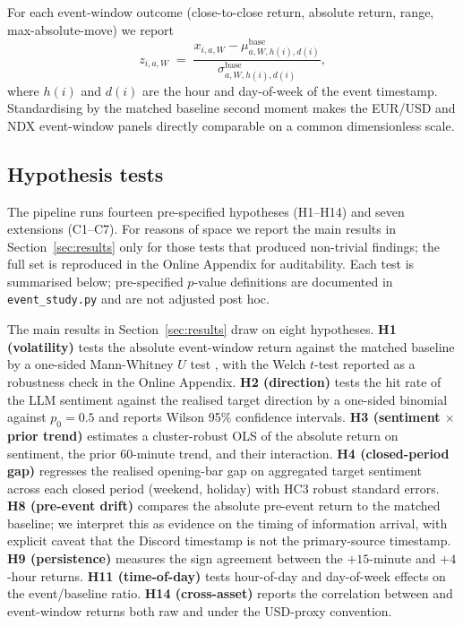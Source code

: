 For each event-window outcome (close-to-close return, absolute
return, range, max-absolute-move) we report
\begin{equation}
z_{i,a,W} \;=\; \frac{x_{i,a,W} - \mu^{\text{base}}_{a,W,h(i),d(i)}}{\sigma^{\text{base}}_{a,W,h(i),d(i)}},
\label{eq:abnormal-z}
\end{equation}
where $h(i)$ and $d(i)$ are the hour and day-of-week of the event
timestamp. Standardising by the matched baseline second moment makes
the EUR/USD and NDX event-window panels directly comparable on a
common dimensionless scale.

\subsection{Hypothesis tests}
\label{ssec:hypothesis-tests}

The pipeline runs fourteen pre-specified hypotheses (H1--H14) and
seven extensions (C1--C7). For reasons of space we report the main
results in Section~\ref{sec:results} only for those tests that
produced non-trivial findings; the full set is reproduced in the
Online Appendix for auditability. Each test is summarised below;
pre-specified $p$-value definitions are documented in
\texttt{event\_study.py} and are not adjusted post hoc.

The main results in Section~\ref{sec:results} draw on eight
hypotheses. \textbf{H1 (volatility)} tests the absolute event-window
return against the matched baseline by a one-sided Mann-Whitney
$U$ test \citep{mann1947test}, with the Welch $t$-test
\citep{welch1947generalization} reported as a robustness check in
the Online Appendix. \textbf{H2 (direction)} tests the hit rate of
the LLM sentiment against the realised target direction by a
one-sided binomial against $p_0 = 0.5$ and reports Wilson 95\%
confidence intervals. \textbf{H3 (sentiment $\times$ prior trend)}
estimates a cluster-robust OLS of the absolute return on sentiment,
the prior 60-minute trend, and their interaction. \textbf{H4
(closed-period gap)} regresses the realised opening-bar gap on
aggregated target sentiment across each closed period (weekend,
holiday) with HC3 robust standard errors. \textbf{H8 (pre-event
drift)} compares the absolute pre-event return to the matched
baseline; we interpret this as evidence on the timing of
information arrival, with explicit caveat that the Discord
timestamp is not the primary-source timestamp. \textbf{H9
(persistence)} measures the sign agreement between the
$+15$-minute and $+4$-hour returns. \textbf{H11 (time-of-day)}
tests hour-of-day and day-of-week effects on the event/baseline
ratio. \textbf{H14 (cross-asset)} reports the correlation between
\eurusd{} and \ndx{} event-window returns both raw and under the
USD-proxy convention.

